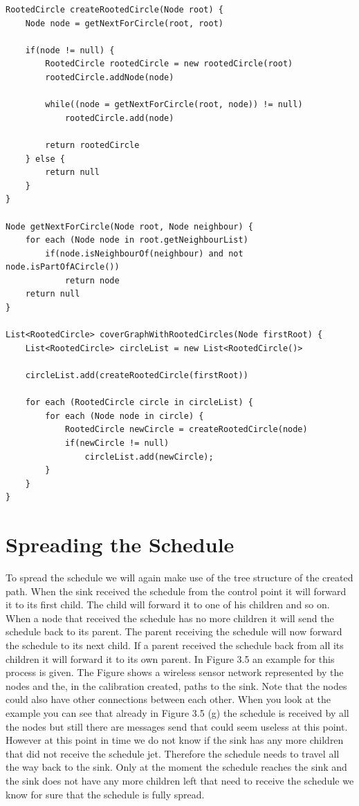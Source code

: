 \begin{lstlisting}
RootedCircle createRootedCircle(Node root) {
	Node node = getNextForCircle(root, root)	

	if(node != null) {
		RootedCircle rootedCircle = new rootedCircle(root)
		rootedCircle.addNode(node)

		while((node = getNextForCircle(root, node)) != null)
			rootedCircle.add(node)

		return rootedCircle
	} else {
		return null
	}
}

Node getNextForCircle(Node root, Node neighbour) {
	for each (Node node in root.getNeighbourList)	
		if(node.isNeighbourOf(neighbour) and not node.isPartOfACircle())
			return node
	return null
}

List<RootedCircle> coverGraphWithRootedCircles(Node firstRoot) {
	List<RootedCircle> circleList = new List<RootedCircle()>
	
	circleList.add(createRootedCircle(firstRoot))

	for each (RootedCircle circle in circleList) {
		for each (Node node in circle) {
			RootedCircle newCircle = createRootedCircle(node)
			if(newCircle != null)
				circleList.add(newCircle);
		}
	}
}
\end{lstlisting}


\section{Spreading the Schedule}
To spread the schedule we will again make use of the tree structure of the created path. When the sink received the schedule from the control point it will forward it to its first child. The child will forward it to one of his children and so on. When a node that received the schedule has no more children it will send the schedule back to its parent. The parent receiving the schedule will now forward the schedule to its next child. If a parent received the schedule back from all its children it will forward it to its own parent. In Figure 3.5 an example for this process is given. The Figure shows a wireless sensor network represented by the nodes and the, in the calibration created, paths to the sink. Note that the nodes could also have other connections between each other. When you look at the example you can see that already in Figure 3.5 (g) the schedule is received by all the nodes but still there are messages send that could seem useless at this point. However at this point in time we do not know if the sink has any more children that did not receive the schedule jet. Therefore the schedule needs to travel all the way back to the sink. Only at the moment the schedule reaches the sink and the sink does not have any more children left that need to receive the schedule we know for sure that the schedule is fully spread.

